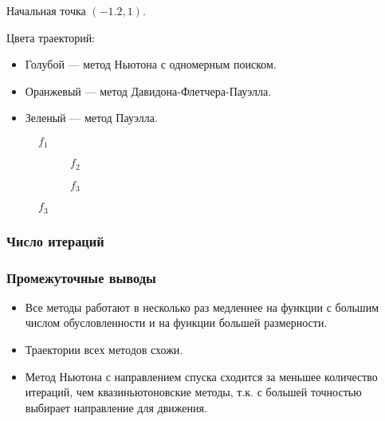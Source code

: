 Начальная точка $(-1.2, 1)$.

Цвета траекторий:
\begin{itemize}
	\item Голубой --- метод Ньютона с одномерным поиском.
	\item Оранжевый --- метод Давидона-Флетчера-Пауэлла.
	\item Зеленый --- метод Пауэлла.
\end{itemize}

\begin{figure}[h]
	\centering
	
	\caption*{\(f_1\)}
\end{figure}

\begin{figure}[h]
	\centering
	\begin{subfigure}{.5\textwidth}
		\centering
		
		\caption*{\(f_2\)}
	\end{subfigure}%
	\begin{subfigure}{.5\textwidth}
		\centering
		
		\caption*{\(f_3\)}
	\end{subfigure}
\end{figure}

\subsubsection{Число итераций}

\begin{minipage}{0.5\textwidth}
\end{minipage}
\begin{minipage}{0.5\textwidth}
\end{minipage}


\subsubsection{Промежуточные выводы}

\begin{itemize}
	\item Все методы работают в несколько раз медленнее на функции с большим числом обусловленности и на функции большей размерности.
	\item Траектории всех методов схожи.
	\item Метод Ньютона с направлением спуска сходится за меньшее количество итераций, чем квазиньютоновские методы, т.к. с большей точностью выбирает направление для движения.
\end{itemize}

